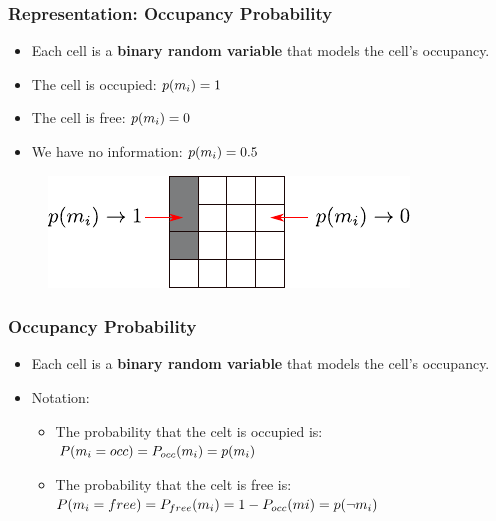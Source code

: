 \begin{frame}
    \frametitle{Representation: Occupancy Probability}
    
    \begin{itemize}
    \item Each cell is a {\bf binary random variable} that models the cell's occupancy.
    \item The cell is occupied: $p(m_{i}) = 1$
    \item The cell is free: $p(m_{i}) = 0$
    \item We have no information: $p(m_{i}) = 0.5$
    \end{itemize}
    
    \begin{figure}[!h]
    \includegraphics[width=0.7\columnwidth]{./images/grid_map_representation.pdf}
    \end{figure}
    \end{frame}
    
    \begin{frame}
    \frametitle{Occupancy Probability}
    \begin{itemize}
    \item Each cell is a {\bf binary random variable} that models the cell's occupancy.
    \item Notation:
    \begin{itemize}
    \item The probability that the celt is occupied is:\\ $P(m_{i} = occ) = P_{occ}(m_{i}) = p(m_{i})$
    \item The probability that the celt is free is:\\ $P(m_{i} = free) = P_{free}(m_{i}) = 1 - P_{occ}(m{i}) = p(\neg m_{i})$
    \end{itemize}
    \end{itemize}
    
    \end{frame}
    

